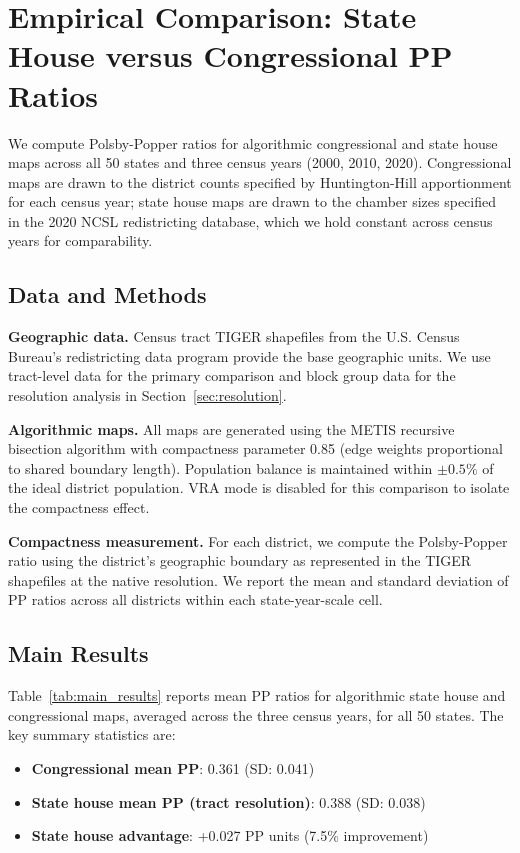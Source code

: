 \section{Empirical Comparison: State House versus Congressional PP Ratios}
\label{sec:empirical}

We compute Polsby-Popper ratios for algorithmic congressional and state house maps across all 50 states and three census years (2000, 2010, 2020). Congressional maps are drawn to the district counts specified by Huntington-Hill apportionment for each census year; state house maps are drawn to the chamber sizes specified in the 2020 NCSL redistricting database, which we hold constant across census years for comparability.

\subsection{Data and Methods}

\textbf{Geographic data.} Census tract TIGER shapefiles from the U.S. Census Bureau's redistricting data program provide the base geographic units. We use tract-level data for the primary comparison and block group data for the resolution analysis in Section~\ref{sec:resolution}.

\textbf{Algorithmic maps.} All maps are generated using the METIS recursive bisection algorithm \citep{karypis1998fast} with compactness parameter 0.85 (edge weights proportional to shared boundary length). Population balance is maintained within $\pm 0.5\%$ of the ideal district population. VRA mode is disabled for this comparison to isolate the compactness effect.

\textbf{Compactness measurement.} For each district, we compute the Polsby-Popper ratio using the district's geographic boundary as represented in the TIGER shapefiles at the native resolution. We report the mean and standard deviation of PP ratios across all districts within each state-year-scale cell.

\subsection{Main Results}

Table~\ref{tab:main_results} reports mean PP ratios for algorithmic state house and congressional maps, averaged across the three census years, for all 50 states. The key summary statistics are:

\begin{itemize}
\item \textbf{Congressional mean PP}: 0.361 (SD: 0.041)
\item \textbf{State house mean PP (tract resolution)}: 0.388 (SD: 0.038)
\item \textbf{State house advantage}: +0.027 PP units (7.5\% improvement)
\end{itemize}

